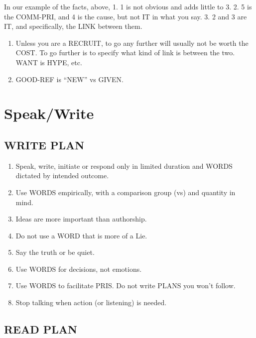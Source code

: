 \documentclass[
]{book}
\providecommand{\tightlist}{%
  \setlength{\itemsep}{0pt}\setlength{\parskip}{0pt}}
\begin{document}
In our example of the facts, above,
1. 1 is not obvious and adds little to 3.
2. 5 is the COMM-PRI, and 4 is the cause, but not IT in what you say.
3. 2 and 3 are IT, and specifically, the LINK between them.

\begin{enumerate}
\def\labelenumi{\arabic{enumi}.}
\setcounter{enumi}{4}
\tightlist
\item
  Unless you are a RECRUIT, to go any further will usually not be worth the COST. To go further is to specify what kind of link is between the two. WANT is HYPE, etc.
\item
  GOOD-REF is ``NEW'' vs GIVEN.
\end{enumerate}

\hypertarget{speakwrite}{%
\section{Speak/Write}\label{speakwrite}}

\hypertarget{write-plan-1}{%
\subsection{WRITE PLAN}\label{write-plan-1}}

\begin{enumerate}
\def\labelenumi{\arabic{enumi}.}
\setcounter{enumi}{29}
\tightlist
\item
  Speak, write, initiate or respond only in limited duration and WORDS
  dictated by intended outcome.
\item
  Use WORDS empirically, with a comparison group (vs) and quantity in mind.
\item
  Ideas are more important than authorship.
\item
  Do not use a WORD that is more of a Lie.
\item
  Say the truth or be quiet.
\item
  Use WORDS for decisions, not emotions.
\item
  Use WORDS to facilitate PRIS. Do not write PLANS you won't follow.
\item
  Stop talking when action (or listening) is needed.
\end{enumerate}

\hypertarget{read-plan}{%
\subsection{READ PLAN}\label{read-plan}}
\end{document}
